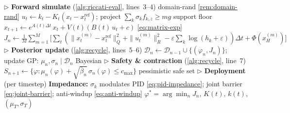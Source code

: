 \begin{algorithm}[H]
\addtocounter{algorithm}{-1}
\caption{Quadruped re-cycle (continued)}
\begin{algorithmic}[1]
  \Statex \hspace{\algorithmicindent}%
    \textcolor{ConColor}{$\triangleright$ \textbf{Forward simulate}
    (\cref{alg:riccati-eval}, lines~3--4)}
    \hfill\textcolor{ConColor}{\small domain-rand
    \cref{rem:domain-rand}}
      \State $u_t \gets k_t - K_t(x_t - x^{\mathrm{ref}}_t)$;\;
        project $\sum_k \sigma_k f_{k,z} \geq mg$
        \hfill\textcolor{ConColor}{\small support floor}
      \State $x_{t+1} \gets e^{A(t)\Delta t}\,x_t
        + V(t)(B(t)\,u_t + c)$
        \hfill\eqref{eq:matrix-exp}
    \EndFor
  \EndFor
  \State $J_n \gets \frac{1}{M}\sum_{m=1}^{M}
    \bigl[\sum_t (\|x_t^{(m)}\!-\!x^{\mathrm{ref}}_t\|_Q^2
    + \|u_t^{(m)}\|_R^2
    - \varepsilon\sum_k\!\log(h_k\!+\!\varepsilon))\Delta t
    + \Phi(x_H^{(m)})\bigr]$
  \Statex \hspace{\algorithmicindent}%
    \textcolor{PostColor}{$\triangleright$ \textbf{Posterior update}
    (\cref{alg:recycle}, lines~5--6)}
  \State $\mathcal{D}_n \gets \mathcal{D}_{n-1}
    \cup \{(\varphi_n, J_n)\}$;\;
    update GP: $\mu_n, \sigma_n \mid \mathcal{D}_n$
    \hfill\textcolor{PostColor}{\small Bayesian}
  \Statex \hspace{\algorithmicindent}%
    \textcolor{ConColor}{$\triangleright$ \textbf{Safety \&
    contraction} (\cref{alg:recycle}, line~7)}
  \State $S_{n+1} \gets \bigl\{\varphi :
    \mu_n(\varphi)
    + \sqrt{\bar\beta_n}\,\sigma_n(\varphi)
    \leq c_{\max}\bigr\}$
    \hfill\textcolor{ConColor}{\small pessimistic safe set}
\EndFor
\Statex \textcolor{CycleColor}{$\triangleright$
  \textbf{Deployment} (per timestep)}
\State \textbf{Impedance:}\;
  $\sigma_k$ modulates PID \eqref{eq:pid-impedance};\;
  joint barrier \eqref{eq:joint-barrier};\;
  anti-windup \eqref{eq:anti-windup}
\State \Return $\varphi^* = \arg\min_n J_n$,\;
  $K(t),\, k(t)$,\;
  $(\mu_T, \sigma_T)$
\end{algorithmic}
\end{algorithm}

